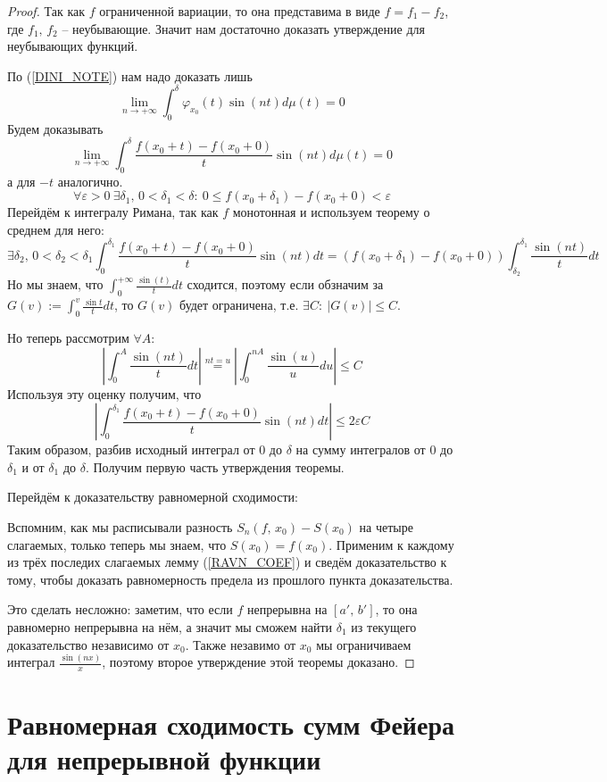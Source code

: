 \documentclass[a4paper,12pt]{article}
\renewcommand{\phi}{\ensuremath{\varphi}}
\renewcommand{\leq}{\ensuremath{\leqslant}}
\theoremstyle{plain}
\theoremstyle{definition}
\theoremstyle{remark}
\begin{document}
\begin{proof}
	Так как $f$ ограниченной вариации, то она представима в виде $f = f_1 - f_2$, где $f_1,\,f_2$ -- неубывающие. Значит нам достаточно доказать утверждение для неубывающих функций.

	По (\ref{DINI_NOTE}) нам надо доказать лишь
	\[\lim_{n \to +\infty} \int_0^\delta \phi_{x_0}(t)\sin(nt)d\mu(t) = 0\]
	Будем доказывать
	\[\lim_{n \to +\infty} \int_0^\delta\frac{f(x_0 + t) - f(x_0 + 0)}{t}\sin(nt)d\mu(t) = 0\]
	а для $-t$ аналогично.
	\[\forall \varepsilon > 0 \: \exists \delta_1,\, 0 < \delta_1 < \delta :\: 0 \leq f(x_0 + \delta_1) - f(x_0 + 0) < \varepsilon\]
	Перейдём к интегралу Римана, так как $f$ монотонная и используем теорему о среднем для него:
	\[\exists \delta_2,\, 0<\delta_2<\delta_1 \int_0^{\delta_1} \frac{f(x_0 + t) - f(x_0 + 0)}{t}\sin(nt)dt = (f(x_0 + \delta_1) - f(x_0 + 0))\int_{\delta_2}^{\delta_1}\frac{\sin(nt)}{t}dt\]
	Но мы знаем, что $\int_0^{+\infty} \frac{\sin(t)}{t}dt$ сходится, поэтому если обзначим за $G(v) := \int_0^v \frac{\sin t}{t}dt$, то $G(v)$ будет ограничена, т.е. $\exists C:\: |G(v)| \leq C$.

	Но теперь рассмотрим $\forall A$:
	\[\left| \int_0^A \frac{\sin(nt)}{t}dt\right| \stackrel{nt = u}{=} \left|\int_0^{nA} \frac{\sin(u)}{u}du\right| \leq C\]
	Используя эту оценку получим, что
	\[\left|\int_0^{\delta_1} \frac{f(x_0 + t) - f(x_0 + 0)}{t}\sin(nt)dt\right| \leq 2\varepsilon C\]
	Таким образом, разбив исходный интеграл от $0$ до $\delta$ на сумму интегралов от $0$ до $\delta_1$ и от $\delta_1$ до $\delta$. Получим первую часть утверждения теоремы.

	Перейдём к доказательству равномерной сходимости:

	Вспомним, как мы расписывали разность $S_n(f,\,x_0) - S(x_0)$ на четыре слагаемых, только теперь мы знаем, что $S(x_0) = f(x_0)$. Применим к каждому из трёх последих слагаемых лемму (\ref{RAVN_COEF}) и сведём доказательство к тому, чтобы доказать равномерность предела из прошлого пункта доказательства.

	Это сделать несложно: заметим, что если $f$ непрерывна на $[a',\,b']$, то она равномерно непрерывна на нём, а значит мы сможем найти $\delta_1$ из текущего доказательство независимо от $x_0$. Также незавимо от $x_0$ мы ограничиваем интеграл $\frac{\sin(nx)}{x}$, поэтому второе утверждение этой теоремы доказано.
\end{proof}

\section{Равномерная сходимость сумм Фейера для непрерывной функции}
\end{document}
